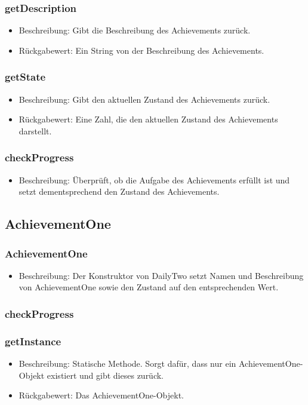 \documentclass[a4paper]{scrreprt}
\begin{document}
	\subsubsection{getDescription}
	\begin{itemize}
		\item Beschreibung: Gibt die Beschreibung des Achievements zurück.
		\item Rückgabewert: Ein String von der Beschreibung des Achievements.
	\end{itemize}
	\subsubsection{getState}
	\begin{itemize}
		\item Beschreibung: Gibt den aktuellen Zustand des Achievements zurück.
		\item Rückgabewert: Eine Zahl, die den aktuellen Zustand des Achievements darstellt.
	\end{itemize}
	\subsubsection{checkProgress}
	\begin{itemize}
		\item Beschreibung: Überprüft, ob die Aufgabe des Achievements erfüllt ist und setzt dementsprechend den Zustand des Achievements.
	\end{itemize}
	
	\subsection{AchievementOne}
	\subsubsection{AchievementOne}
	\begin{itemize}
		\item Beschreibung: Der Konstruktor von DailyTwo setzt Namen und Beschreibung von AchievementOne sowie den Zustand auf den entsprechenden Wert.
	\end{itemize}
	\subsubsection{checkProgress}
	\subsubsection{getInstance}
	\begin{itemize}
		\item Beschreibung: Statische Methode. Sorgt dafür, dass nur ein AchievementOne-Objekt existiert und gibt dieses zurück.
		\item Rückgabewert: Das AchievementOne-Objekt.
	\end{itemize}
	
\end{document}
